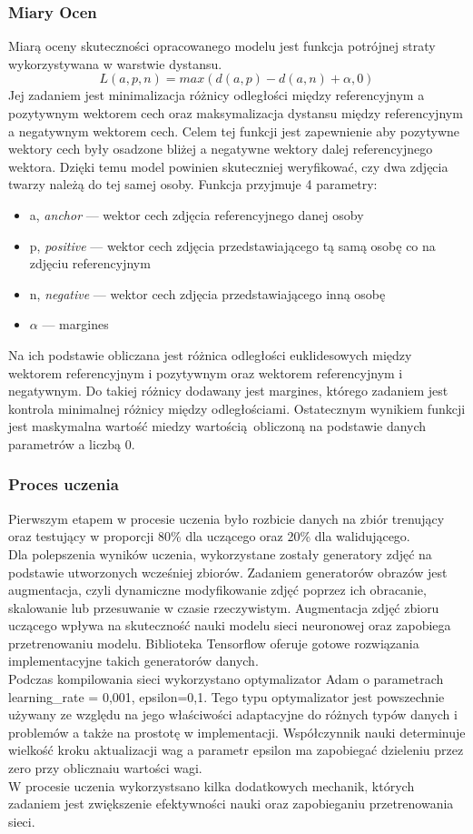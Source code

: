 \subsubsection{Miary Ocen}
Miarą oceny skuteczności opracowanego modelu jest funkcja potrójnej straty \cite{tripleloss} wykorzystywana w warstwie dystansu.
$$ L(a, p, n) = max(d(a, p) - d(a, n) + \alpha, 0) $$
  Jej zadaniem jest minimalizacja różnicy odległości między referencyjnym a pozytywnym wektorem cech oraz maksymalizacja dystansu między referencyjnym a negatywnym wektorem cech. Celem tej funkcji jest zapewnienie aby pozytywne wektory cech były osadzone bliżej a negatywne wektory dalej referencyjnego wektora. Dzięki temu model powinien skuteczniej weryfikować, czy dwa zdjęcia twarzy należą do tej samej osoby.
Funkcja przyjmuje 4 parametry:
\begin{itemize}
  \item a, \emph{anchor} --- wektor cech zdjęcia referencyjnego danej osoby
  \item p, \emph{positive} --- wektor cech zdjęcia przedstawiającego tą samą osobę co na zdjęciu referencyjnym
  \item n, \emph{negative} --- wektor cech zdjęcia przedstawiającego inną osobę
  \item $\alpha$ --- margines
\end{itemize}
Na ich podstawie obliczana jest różnica odległości euklidesowych między wektorem referencyjnym i pozytywnym oraz wektorem referencyjnym i negatywnym. Do takiej różnicy dodawany jest margines, którego zadaniem jest kontrola minimalnej różnicy między odległościami. Ostatecznym wynikiem funkcji jest maskymalna wartość miedzy wartością obliczoną na podstawie danych parametrów a liczbą 0. 
\subsubsection{Proces uczenia}
Pierwszym etapem w procesie uczenia było rozbicie danych na zbiór trenujący oraz testujący w proporcji 80\% dla uczącego oraz 20\% dla walidującego. \\
Dla polepszenia wyników uczenia, wykorzystane zostały generatory zdjęć na podstawie utworzonych wcześniej zbiorów. Zadaniem generatorów obrazów jest augmentacja, czyli dynamiczne modyfikowanie zdjęć poprzez ich obracanie, skalowanie lub przesuwanie w czasie rzeczywistym. Augmentacja zdjęć zbioru uczącego wpływa na skuteczność nauki modelu sieci neuronowej oraz zapobiega przetrenowaniu modelu. Biblioteka Tensorflow oferuje gotowe rozwiązania implementacyjne takich generatorów danych. \\
Podczas kompilowania sieci wykorzystano optymalizator Adam o parametrach learning\_rate = 0,001, epsilon=0,1. Tego typu optymalizator jest powszechnie używany ze względu na jego właściwości adaptacyjne do różnych typów danych i problemów a także na prostotę w implementacji. Współczynnik nauki determinuje wielkość kroku aktualizacji wag a parametr epsilon ma zapobiegać dzieleniu przez zero przy oblicznaiu wartości wagi. \\
W procesie uczenia wykorzystsano kilka dodatkowych mechanik, których zadaniem jest zwiększenie efektywności nauki oraz zapobieganiu przetrenowania sieci.
